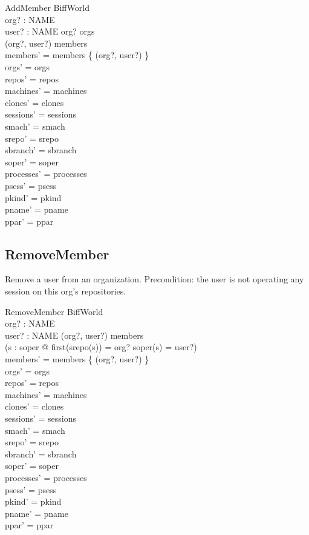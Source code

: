 \documentclass[a4paper,10pt,fleqn]{article}
\begin{document}
\begin{schema}{AddMember}
  \Delta BiffWorld \\
  org? : NAME \\
  user? : NAME
  \where
  org? \in orgs \\
  (org?, user?) \notin members \\
  members' = members \cup \{ (org?, user?) \} \\
  orgs' = orgs \\
  repos' = repos \\
  machines' = machines \\
  clones' = clones \\
  sessions' = sessions \\
  smach' = smach \\
  srepo' = srepo \\
  sbranch' = sbranch \\
  soper' = soper \\
  processes' = processes \\
  psess' = psess \\
  pkind' = pkind \\
  pname' = pname \\
  ppar' = ppar
\end{schema}

\subsection{RemoveMember}

Remove a user from an organization.  Precondition: the user is not
operating any session on this org's repositories.

\begin{schema}{RemoveMember}
  \Delta BiffWorld \\
  org? : NAME \\
  user? : NAME
  \where
  (org?, user?) \in members \\
  \lnot (\exists s : \dom soper @
    first(srepo(s)) = org? \land soper(s) = user?) \\
  members' = members \setminus \{ (org?, user?) \} \\
  orgs' = orgs \\
  repos' = repos \\
  machines' = machines \\
  clones' = clones \\
  sessions' = sessions \\
  smach' = smach \\
  srepo' = srepo \\
  sbranch' = sbranch \\
  soper' = soper \\
  processes' = processes \\
  psess' = psess \\
  pkind' = pkind \\
  pname' = pname \\
  ppar' = ppar
\end{schema}
\end{document}

